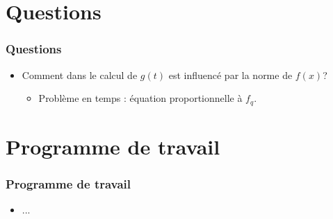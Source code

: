 \documentclass[12pt]{beamer}
\begin{document}

%
%	
%	

\section{Questions}

	\begin{frame}
	
		\frametitle{Questions}
		
		\begin{itemize}
			\item Comment dans le calcul de $g(t)$ est influencé par la norme de $f(x)$?
			\begin{itemize}
				\item Problème en temps : équation proportionnelle à $f_q$.
			\end{itemize}
		\end{itemize}
	
	\end{frame}
	
\section{Programme de travail}

	\begin{frame}
	
		\frametitle{Programme de travail}
		
		\begin{itemize}
			\item ...
		\end{itemize}
	
	\end{frame}
\end{document}
